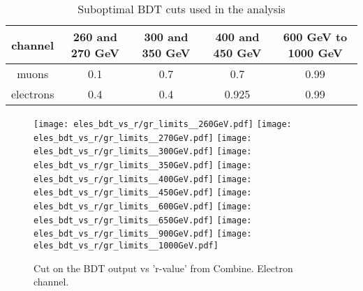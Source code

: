 \begin{table}
\begin{center} 
  \caption{Suboptimal BDT cuts used in the analysis}
 \begin{tabular}{ |c|c|c|c|c| } \hline%
   channel & 260 and 270 GeV & 300 and 350 GeV & 400 and 450 GeV & 600 GeV to 1000 GeV \\ \hline
   muons & 0.1 & 0.7 & 0.7 & 0.99 \\ %
   electrons & 0.4 & 0.4 & 0.925 & 0.99\\ \hline%
  \end{tabular}
  \label{suboptCut}
\end{center}   
\end{table}









\begin{figure}[!htb]%
\texttt{[image: eles\_bdt\_vs\_r/gr\_limits\_\_260GeV.pdf]}
\texttt{[image: eles\_bdt\_vs\_r/gr\_limits\_\_270GeV.pdf]}
\texttt{[image: eles\_bdt\_vs\_r/gr\_limits\_\_300GeV.pdf]}
\texttt{[image: eles\_bdt\_vs\_r/gr\_limits\_\_350GeV.pdf]}
\texttt{[image: eles\_bdt\_vs\_r/gr\_limits\_\_400GeV.pdf]}
\texttt{[image: eles\_bdt\_vs\_r/gr\_limits\_\_450GeV.pdf]}
\texttt{[image: eles\_bdt\_vs\_r/gr\_limits\_\_600GeV.pdf]}
\texttt{[image: eles\_bdt\_vs\_r/gr\_limits\_\_650GeV.pdf]}
\texttt{[image: eles\_bdt\_vs\_r/gr\_limits\_\_900GeV.pdf]}
\hspace{1.9cm}
\texttt{[image: eles\_bdt\_vs\_r/gr\_limits\_\_1000GeV.pdf]}
\caption{ Cut on the BDT output vs 'r-value' from Combine. Electron channel.}
\label{fig:ele_bdt_vs_r}                                                       
\end{figure}



